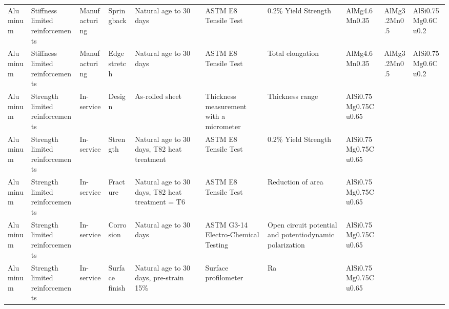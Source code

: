 \begin{table}[!htbp]
\begin{threeparttable}
{\begin{tabular}{@{}p{1.5cm} p{2.4cm} p{2cm} p{2.5cm} p{4cm} p{3.5cm} p{3.8cm} p{3.2cm} p{2.7cm} p{2.7cm}@{}}
{Aluminum} & {Stiffness limited reinforcements} & {Manufacturing} & {Springback}      & {Natural age to 30 days}                                              & {ASTM E8 Tensile Test}                    & {0.2\% Yield Strength}                                     & {AlMg4.6Mn0.35}               & {AlMg3.2Mn0.5} & {AlSi0.75Mg0.6Cu0.2} \\
{Aluminum} & {Stiffness limited reinforcements} & {Manufacturing} & {Edge stretch}    & {Natural age to 30 days}                                              & {ASTM E8 Tensile Test}                    & {Total elongation}                                         & {AlMg4.6Mn0.35}               & {AlMg3.2Mn0.5} & {AlSi0.75Mg0.6Cu0.2} \\ \hline
{Aluminum} & {Strength limited reinforcements}  & {In-service}    & {Design}          & {As-rolled sheet}                                                     & {Thickness measurement with a micrometer} & {Thickness range}                                          & {AlSi0.75Mg0.75Cu0.65}        & {}             & {}                   \\
{Aluminum} & {Strength limited reinforcements}  & {In-service}    & {Strength}        & {Natural age to 30 days, T82 heat treatment}                          & {ASTM E8 Tensile Test}                    & {0.2\% Yield Strength}                                     & {AlSi0.75Mg0.75Cu0.65}        & {}             & {}                   \\
{Aluminum} & {Strength limited reinforcements}  & {In-service}    & {Fracture}        & {Natural age to 30 days, T82 heat treatment = T6}                     & {ASTM E8 Tensile Test}                    & {Reduction of area}                                        & {AlSi0.75Mg0.75Cu0.65}        & {}             & {}                   \\
{Aluminum} & {Strength limited reinforcements}  & {In-service}    & {Corrosion}       & {Natural age to 30 days}                                              & {ASTM G3-14 Electro-Chemical Testing}     & {Open circuit potential and potentiodynamic polarization}  & {AlSi0.75Mg0.75Cu0.65}        & {}             & {}                   \\
{Aluminum} & {Strength limited reinforcements}  & {In-service}    & {Surface finish}  & {Natural age to 30 days, pre-strain 15\%}                             & {Surface profilometer}                    & {Ra}                                                       & {AlSi0.75Mg0.75Cu0.65}        & {}             & {}                   \\

\end{tabular}}
\end{threeparttable}
\end{table}
